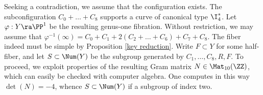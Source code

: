 \proof
Seeking a contradiction, we assume that the configuration  exists.
The subconfiguration  $C_0+\ldots+C_8$ supports a curve of canonical type $\I_4^*$. Let $\varphi:Y\ra\PP^1$ be the resulting
genus-one fibration.  Without restriction, we may assume that
$\varphi^{-1}(\infty) = C_0+C_1+2(C_2+\ldots+C_6)+C_7+C_8$.
The fiber   indeed must be simple by Proposition \ref{key reduction}. Write $F\subset Y$ for some half-fiber, and let
$S\subset\Num(Y)$ be the subgroup generated by $C_1,\ldots,C_8,R,F$.
To proceed, we exploit properties of the resulting Gram matrix $N\in\Mat_{10}(\ZZ)$, which can easily be checked
with computer algebra.
One computes in this way $\det(N)=-4$, whence $S\subset \Num(Y)$ if a subgroup of index two.
%
%
%
%

